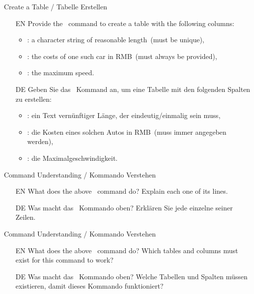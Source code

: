 %
%
\begin{question}{Create a Table / Tabelle Erstellen}%
\begin{itemize}%
\item[EN] Provide the \sqlDialect\ command to create a table  with the following columns:%
\begin{itemize}%
\item {}: a character string of reasonable length~(must be unique),%
\item {}: the costs of one such car in RMB~(must always be provided),%
\item {}: the maximum speed.
\end{itemize}%
%
\item[DE] Geben Sie das \sqlDialect\ Kommand an, um eine Tabelle  mit den folgenden Spalten zu erstellen:%
\begin{itemize}%
\item {}: ein Text vernünftiger Länge, der eindeutig/einmalig sein muss,%
\item {}: die Kosten eines solchen Autos in RMB~(muss immer angegeben werden),%
\item {}: die Maximalgeschwindigkeit.
\end{itemize}%
\end{itemize}%
\end{question}%
%
%
\begin{question}{Command Understanding / Kommando Verstehen}%
%
%
\begin{itemize}%
\item[EN] What does the above \sqlDialect\ command do? %
Explain each one of its lines.%
\item[DE] Was macht das \sqlDialect\ Kommando oben? %
Erklären Sie jede einzelne seiner Zeilen.%
\end{itemize}%
\end{question}%
%
%
\begin{question}{Command Understanding / Kommando Verstehen}%
%
%
\begin{itemize}%
\item[EN] What does the above \sqlDialect\ command do? %
Which tables and columns must exist for this command to work?%
\item[DE] Was macht das \sqlDialect\ Kommando oben? %
Welche Tabellen und Spalten müssen existieren, damit dieses Kommando funktioniert?%
\end{itemize}%
\end{question}%

